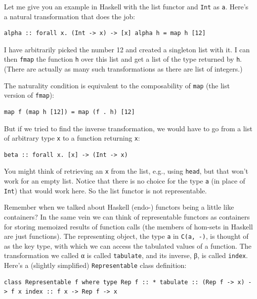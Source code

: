Let me give you an example in Haskell with the list functor and
\texttt{Int} as \texttt{a}. Here's a natural transformation that does
the job:

\begin{verbatim}
alpha :: forall x. (Int -> x) -> [x] alpha h = map h [12]
\end{verbatim}

I have arbitrarily picked the number 12 and created a singleton list
with it. I can then \texttt{fmap} the function \texttt{h} over this list
and get a list of the type returned by \texttt{h}. (There are actually
as many such transformations as there are list of integers.)

The naturality condition is equivalent to the composability of
\texttt{map} (the list version of \texttt{fmap}):

\begin{verbatim}
map f (map h [12]) = map (f . h) [12]
\end{verbatim}

But if we tried to find the inverse transformation, we would have to go
from a list of arbitrary type \texttt{x} to a function returning
\texttt{x}:

\begin{verbatim}
beta :: forall x. [x] -> (Int -> x)
\end{verbatim}

You might think of retrieving an \texttt{x} from the list, e.g., using
\texttt{head}, but that won't work for an empty list. Notice that there
is no choice for the type \texttt{a} (in place of \texttt{Int}) that
would work here. So the list functor is not representable.

Remember when we talked about Haskell (endo-) functors being a little
like containers? In the same vein we can think of representable functors
as containers for storing memoized results of function calls (the
members of hom-sets in Haskell are just functions). The representing
object, the type \texttt{a} in \texttt{C(a,\ -)}, is thought of as the
key type, with which we can access the tabulated values of a function.
The transformation we called α is called \texttt{tabulate}, and its
inverse, β, is called \texttt{index}. Here's a (slightly simplified)
\texttt{Representable} class definition:

\begin{verbatim}
class Representable f where type Rep f :: * tabulate :: (Rep f -> x) -> f x index :: f x -> Rep f -> x
\end{verbatim}

